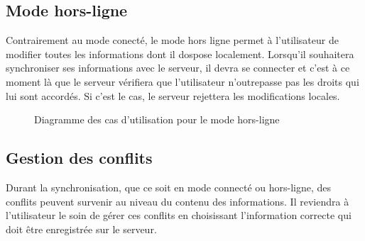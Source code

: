 \subsection{Mode hors-ligne}
Contrairement au mode conecté, le mode hors ligne permet à l'utilisateur de modifier toutes les informations dont il dospose localement. Lorsqu'il souhaitera synchroniser ses informations avec le serveur, il devra se connecter et c'est à ce moment là que le serveur vérifiera que l'utilisateur n'outrepasse pas les droits qui lui sont accordés. Si c'est le cas, le serveur rejettera les modifications locales.
\begin{figure}[htbp]
    \centering
	\caption{Diagramme des cas d'utilisation pour le mode hors-ligne}
	\label{ucmodedeco}
\end{figure}

\subsection{Gestion des conflits}
Durant la synchronisation, que ce soit en mode connecté ou hors-ligne, des conflits peuvent survenir au niveau du contenu des informations. Il reviendra à l'utilisateur le soin de gérer ces conflits en choisissant l'information correcte qui doit être enregistrée sur le serveur.

